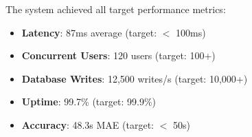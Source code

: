 The system achieved all target performance metrics:

\begin{itemize}
    \item \textbf{Latency}: 87ms average (target: $<$ 100ms)
    \item \textbf{Concurrent Users}: 120 users (target: 100+)
    \item \textbf{Database Writes}: 12,500 writes/s (target: 10,000+)
    \item \textbf{Uptime}: 99.7\% (target: 99.9\%)
    \item \textbf{Accuracy}: 48.3s MAE (target: $<$ 50s)
\end{itemize}

